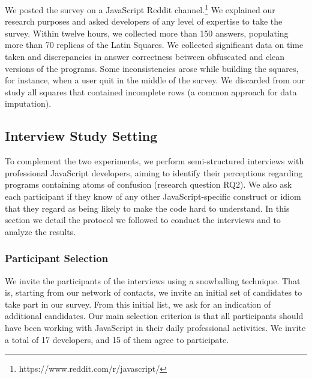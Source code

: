 We posted the survey on a JavaScript Reddit channel.\footnote{https://www.reddit.com/r/javascript/} We explained our research purposes and asked developers of any level of expertise to take the survey. Within twelve hours, we collected more than 150 answers, populating more than 70 replicas of the Latin Squares. We collected significant data on time taken and discrepancies in answer correctness between obfuscated and clean versions of the programs. Some inconsistencies arose while building the squares, for instance, when a user quit in the middle of the survey. We discarded from our study all squares that contained incomplete rows (a common approach for data imputation).

 
\subsection{Interview Study Setting}

To complement the two experiments, we perform semi-structured interviews with professional JavaScript developers, aiming to identify their perceptions regarding programs containing atoms of confusion (research question RQ2). We also ask each participant if they know of any other JavaScript-specific construct or idiom that they regard as being likely to make the code hard to understand.%
In this section we detail the protocol we followed to conduct the interviews and to analyze the results.


\subsubsection*{Participant Selection} We invite the participants of the interviews using a snowballing technique. That is, starting from our network of contacts, we invite an initial set of candidates to take part in our survey. From this initial list, we ask for an indication of additional candidates. Our main selection criterion is that all participants should have been working with JavaScript in their daily professional activities. We invite a total of 17 developers, and 15 of them agree to participate.   


